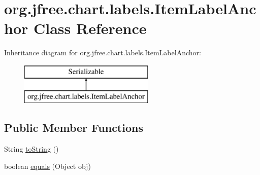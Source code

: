 \hypertarget{classorg_1_1jfree_1_1chart_1_1labels_1_1_item_label_anchor}{}\section{org.\+jfree.\+chart.\+labels.\+Item\+Label\+Anchor Class Reference}
\label{classorg_1_1jfree_1_1chart_1_1labels_1_1_item_label_anchor}
Inheritance diagram for org.\+jfree.\+chart.\+labels.\+Item\+Label\+Anchor\+:\begin{figure}[H]
\begin{center}
\leavevmode
\includegraphics[height=2.000000cm]{classorg_1_1jfree_1_1chart_1_1labels_1_1_item_label_anchor}
\end{center}
\end{figure}
\subsection*{Public Member Functions}
\begin{DoxyCompactItemize}
\item 
String \mbox{\hyperlink{classorg_1_1jfree_1_1chart_1_1labels_1_1_item_label_anchor_a82c2ba8072f6d297362787ba0d48e66e}{to\+String}} ()
\item 
boolean \mbox{\hyperlink{classorg_1_1jfree_1_1chart_1_1labels_1_1_item_label_anchor_ac436b669ebf75b3065916161dcee6489}{equals}} (Object obj)
\end{DoxyCompactItemize}
